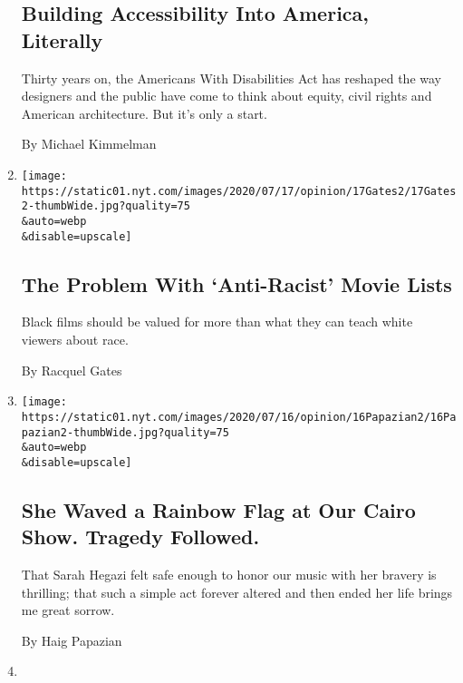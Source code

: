 \begin{enumerate}
  \hypertarget{building-accessibility-into-america-literally}{%
  \subsection{Building Accessibility Into America,
  Literally}\label{building-accessibility-into-america-literally}}

  Thirty years on, the Americans With Disabilities Act has reshaped the
  way designers and the public have come to think about equity, civil
  rights and American architecture. But it's only a start.

  By Michael Kimmelman
\item
  \href{/2020/07/17/opinion/sunday/black-film-movies-racism.html}{}

  \texttt{[image: https://static01.nyt.com/images/2020/07/17/opinion/17Gates2/17Gates2-thumbWide.jpg?quality=75\\\&auto=webp\\\&disable=upscale]}

  \hypertarget{the-problem-with-anti-racist-movie-lists}{%
  \subsection{The Problem With `Anti-Racist' Movie
  Lists}\label{the-problem-with-anti-racist-movie-lists}}

  Black films should be valued for more than what they can teach white
  viewers about race.

  By Racquel Gates
\item
  \href{/2020/07/16/opinion/culture/mashrou-leila-fan-suicide.html}{}

  \texttt{[image: https://static01.nyt.com/images/2020/07/16/opinion/16Papazian2/16Papazian2-thumbWide.jpg?quality=75\\\&auto=webp\\\&disable=upscale]}

  \hypertarget{she-waved-a-rainbow-flag-at-our-cairo-show-tragedy-followed}{%
  \subsection{She Waved a Rainbow Flag at Our Cairo Show. Tragedy
  Followed.}\label{she-waved-a-rainbow-flag-at-our-cairo-show-tragedy-followed}}

  That Sarah Hegazi felt safe enough to honor our music with her bravery
  is thrilling; that such a simple act forever altered and then ended
  her life brings me great sorrow.

  By Haig Papazian
\item
  \href{/2020/07/12/opinion/letter-writing-coronavirus.html}{}


\end{enumerate}

